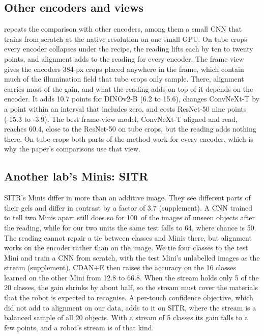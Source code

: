 \subsection{Other encoders and views}
\label{sec:encoders}

 repeats the comparison with other encoders, among them a small CNN that trains from scratch at the native resolution on one small GPU. On tube crops every encoder collapses under the recipe, the reading lifts each by ten to twenty points, and alignment adds to the reading for every encoder. The frame view gives the encoders 384-px crops placed anywhere in the frame, which contain much of the illumination field that tube crops only sample. There, alignment carries most of the gain, and what the reading adds on top of it depends on the encoder. It adds 10.7 points for DINOv2-B (6.2 to 15.6), changes ConvNeXt-T by a point within an interval that includes zero, and costs ResNet-50 nine points (-15.3 to -3.9). The best frame-view model, ConvNeXt-T aligned and read, reaches 60.4\pct, close to the ResNet-50 on tube crops, but the reading adds nothing there. On tube crops both parts of the method work for every encoder, which is why the paper's comparisons use that view.

\subsection{Another lab's Minis: SITR}
\label{sec:second}

SITR's Minis differ in more than an additive image. They see different parts of their gels and differ in contrast by a factor of 3.7 (supplement). A CNN trained to tell two Minis apart still does so for 100\pct\ of the images of unseen objects after the reading, while for our two units the same test falls to 64\pct, where chance is 50\pct. The reading cannot repair a tie between classes and Minis there, but alignment works on the encoder rather than on the image. We tie four classes to the test Mini and train a CNN from scratch, with the test Mini's unlabelled images as the stream (supplement). CDAN+E then raises the accuracy on the 16 classes learned on the other Mini from 12.8 to 66.8\pct. When the stream holds only 5 of the 20 classes, the gain shrinks by about half, so the stream must cover the materials that the robot is expected to recognise. A per-touch confidence objective, which did not add to alignment on our data, adds to it on SITR, where the stream is a balanced sample of all 20 objects. With a stream of 5 classes its gain falls to a few points, and a robot's stream is of that kind.

